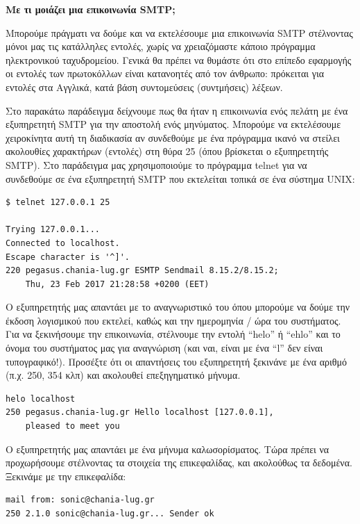 \begin{inthebox}
\textbf{Με τι μοιάζει μια επικοινωνία SMTP;}

Μπορούμε πράγματι να δούμε και να εκτελέσουμε μια επικοινωνία SMTP στέλνοντας μόνοι μας τις κατάλληλες εντολές, χωρίς να χρειαζόμαστε κάποιο πρόγραμμα ηλεκτρονικού ταχυδρομείου. Γενικά θα πρέπει να θυμάστε ότι στο επίπεδο εφαρμογής οι εντολές των πρωτοκόλλων είναι κατανοητές από τον άνθρωπο: πρόκειται για εντολές στα Αγγλικά, κατά βάση συντομεύσεις (συντμήσεις) λέξεων.

Στο παρακάτω παράδειγμα δείχνουμε πως θα ήταν η επικοινωνία ενός πελάτη με ένα εξυπηρετητή SMTP για την αποστολή ενός μηνύματος. Μπορούμε να εκτελέσουμε χειροκίνητα αυτή τη διαδικασία αν συνδεθούμε με ένα πρόγραμμα ικανό να στείλει ακολουθίες χαρακτήρων (εντολές) στη θύρα 25 (όπου βρίσκεται ο εξυπηρετητής SMTP). Στο παράδειγμα μας χρησιμοποιούμε το πρόγραμμα telnet για να συνδεθούμε σε ένα εξυπηρετητή SMTP που εκτελείται τοπικά σε ένα σύστημα UNIX:

\begin{verbatim}
$ telnet 127.0.0.1 25

Trying 127.0.0.1...
Connected to localhost.
Escape character is '^]'.
220 pegasus.chania-lug.gr ESMTP Sendmail 8.15.2/8.15.2; 
    Thu, 23 Feb 2017 21:28:58 +0200 (EET)
\end{verbatim}

Ο εξυπηρετητής μας απαντάει με το αναγνωριστικό του όπου μπορούμε να δούμε την έκδοση λογισμικού που εκτελεί, καθώς και την ημερομηνία / ώρα του συστήματος. Για να ξεκινήσουμε την επικοινωνία, στέλνουμε την εντολή ``helo'' ή ``ehlo'' και το όνομα του συστήματος μας για αναγνώριση (και ναι, είναι με ένα ``l'' δεν είναι τυπογραφικό!). Προσέξτε ότι οι απαντήσεις του εξυπηρετητή ξεκινάνε με ένα αριθμό (π.χ. 250, 354 κλπ) και ακολουθεί επεξηγηματικό μήνυμα.

\begin{verbatim}
helo localhost
250 pegasus.chania-lug.gr Hello localhost [127.0.0.1],
    pleased to meet you
\end{verbatim}

Ο εξυπηρετητής μας απαντάει με ένα μήνυμα καλωσορίσματος. Τώρα πρέπει να προχωρήσουμε στέλνοντας τα στοιχεία της επικεφαλίδας, και ακολούθως τα δεδομένα. Ξεκινάμε με την επικεφαλίδα:

\begin{verbatim}
mail from: sonic@chania-lug.gr
250 2.1.0 sonic@chania-lug.gr... Sender ok
\end{verbatim}


\end{inthebox}
